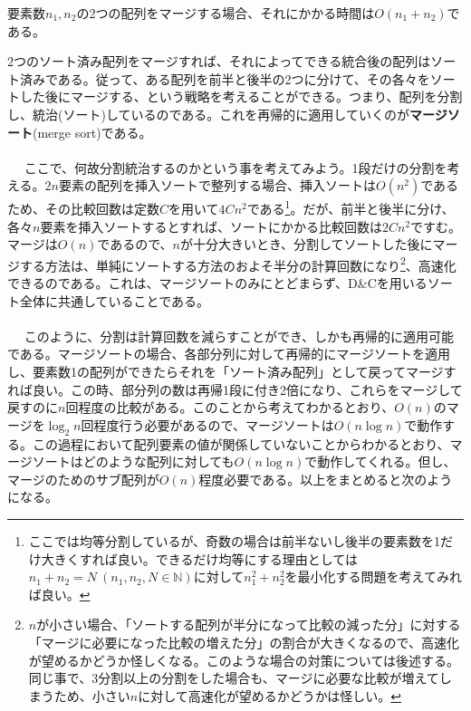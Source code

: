 要素数$n_1,n_2$の2つの配列をマージする場合、それにかかる時間は$O(n_1+n_2)$である。

2つのソート済み配列をマージすれば、それによってできる統合後の配列はソート済みである。従って、ある配列を前半と後半の2つに分けて、その各々をソートした後にマージする、という戦略を考えることができる。つまり、配列を分割し、統治(ソート)しているのである。これを再帰的に適用していくのが\textbf{マージソート}(merge sort)である。
\\ \\　
ここで、何故分割統治するのかという事を考えてみよう。1段だけの分割を考える。$2n$要素の配列を挿入ソートで整列する場合、挿入ソートは$O(n^2)$であるため、その比較回数は定数$C$を用いて$4Cn^2$である\footnote{ここでは均等分割しているが、奇数の場合は前半ないし後半の要素数を1だけ大きくすれば良い。できるだけ均等にする理由としては$n_1+n_2=N\ (n_1,n_2,N\in\mathbb{N})$に対して$n_1^2+n_2^2$を最小化する問題を考えてみれば良い。}。だが、前半と後半に分け、各々$n$要素を挿入ソートするとすれば、ソートにかかる比較回数は$2Cn^2$ですむ。マージは$O(n)$であるので、$n$が十分大きいとき、分割してソートした後にマージする方法は、単純にソートする方法のおよそ半分の計算回数になり\footnote{$n$が小さい場合、「ソートする配列が半分になって比較の減った分」に対する「マージに必要になった比較の増えた分」の割合が大きくなるので、高速化が望めるかどうか怪しくなる。このような場合の対策については後述する。同じ事で、3分割以上の分割をした場合も、マージに必要な比較が増えてしまうため、小さい$n$に対して高速化が望めるかどうかは怪しい。}、高速化できるのである。これは、マージソートのみにとどまらず、D\&Cを用いるソート全体に共通していることである。
\\ \\　
このように、分割は計算回数を減らすことができ、しかも再帰的に適用可能である。マージソートの場合、各部分列に対して再帰的にマージソートを適用し、要素数1の配列ができたらそれを「ソート済み配列」として戻ってマージすれば良い。この時、部分列の数は再帰1段に付き2倍になり、これらをマージして戻すのに$n$回程度の比較がある。このことから考えてわかるとおり、$O(n)$のマージを$\log_2 n$回程度行う必要があるので、マージソートは$O(n\log n)$で動作する。この過程において配列要素の値が関係していないことからわかるとおり、マージソートはどのような配列に対しても$O(n\log n)$で動作してくれる。但し、マージのためのサブ配列が$O(n)$程度必要である。以上をまとめると次のようになる。
